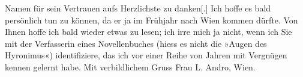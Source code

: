 \begin{ledgroupsized}[t]{13cm}
                    Namen für sein Vertrauen aufs Herzlichste zu danken{[}.{]} Ich
                    hoffe es bald persönlich tun zu können, da er ja im Frühjahr nach Wien kommen dürfte. Von Ihnen hoffe ich bald
                    wieder etwas zu lesen; ich irre mich ja nicht, wenn ich Sie mit der Verfasserin
                    eines Novellenbuches (hiess es nicht die »Augen des
                            Hyronimus«) identifiziere, das ich vor
                    einer Reihe von Jahren mit Vergnügen kennen gelernt habe.\pend
           \pstart Mit verbildlichem Gruss\pend{}{\bigskip}\pstart
           \noindent{}Frau L. Andro, Wien.\pend
           \endnumbering{}\end{ledgroupsized}  \newcommand{\dateiname}{L02574}\newcommand{\titel}{Arthur Schnitzler an Therese Rie-Andro, 12. 2. 1912}\newcommand{\editorInnen}{Martin Anton Müller und Gerd-Hermann Susen}
      